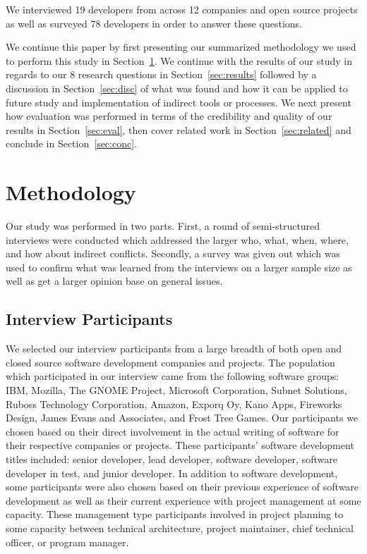 \documentclass[conference]{IEEEtran}
\begin{document}
We interviewed 19 developers from across 12 companies and open source projects as well as surveyed 78 
developers in order to answer these questions. 


We continue this paper by first presenting our summarized methodology we used to perform this study in Section~\ref{sec:meth}. We
continue with the results of our study in regards to our 8 research questions in Section~\ref{sec:results} 
followed by a discussion in Section~\ref{sec:disc} of what was found and how it can be applied to future study and implementation
of indirect tools or processes. We next present how evaluation was performed in terms of the credibility
and quality of our results in Section~\ref{sec:eval}, then cover related work in Section~\ref{sec:related}
and conclude in Section~\ref{sec:conc}.

\section{Methodology}
\label{sec:meth}

Our study was performed in two parts. First, a round of semi-structured interviews were conducted which 
addressed the larger who, what, when, where, and how about indirect conflicts. Secondly, a survey was given
out which was used to confirm what was learned from the interviews on a larger sample size as well as get
a larger opinion base on general issues.

\subsection{Interview Participants}

We selected our interview participants from a large breadth of both open and closed source software development companies
and projects. The population which participated in our interview came from the following software groups: 
IBM, Mozilla, The GNOME Project, Microsoft Corporation, Subnet Solutions, Ruboss Technology Corporation, 
Amazon, Exporq Oy, Kano Apps, Fireworks Design, James Evans and Associates, and Frost Tree Games. 
Our participants we chosen based on their direct involvement in the actual writing of software for
their respective companies or projects. These participants' software development titles included: senior developer,
lead developer, software developer, software developer in test, and junior developer.
In addition to software development, some participants were also chosen based on their previous experience
of software development as well as their current experience with project management at some capacity. These management
type participants involved in project planning to some capacity between technical architecture, project maintainer,  
chief technical officer, or program manager.
\end{document}
